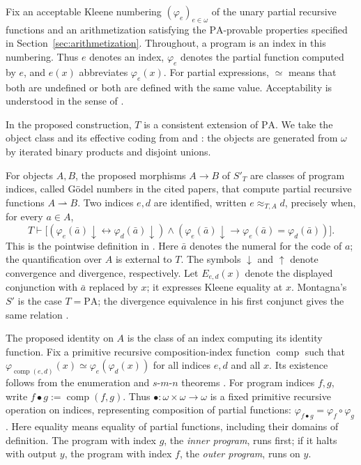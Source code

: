\documentclass[11pt]{article}
\newcommand{\PA}{\mathrm{PA}}
\newcommand{\comp}{\operatorname{comp}}
\begin{document}
Fix an acceptable Kleene numbering $(\varphi_e)_{e\in\omega}$ of the unary
partial recursive functions and an arithmetization satisfying the
$\PA$-provable properties specified in
Section~\ref{sec:arithmetization}.
Throughout, a program is an index in this
numbering. Thus $e$ denotes an index, $\varphi_e$ denotes the partial function
computed by $e$, and $e(x)$ abbreviates $\varphi_e(x)$.
For partial expressions, $\simeq$ means that both are undefined or
both are defined with the same value.
Acceptability is understood
in the sense of \cite[Definitions~II.5.1--II.5.2, p.~215]{Odifreddi}.

In the proposed construction, $T$ is a consistent extension of $\PA$.
We take the object class and its effective coding from
\cite[pp.~105--106]{Montagna} and
\cite[p.~646]{DiPaolaMontagna}: the objects are generated from
$\omega$ by iterated binary products and disjoint unions.

For objects $A,B$, the proposed morphisms $A\to B$ of $S'_T$ are
classes of program indices, called G\"odel numbers in the cited papers,
that compute partial recursive functions $A\rightharpoonup B$.
Two indices $e,d$ are identified,
written $e\approx_{T,A}d$, precisely when, for every $a\in A$,
\begin{equation*}
 T\vdash
 \bigl[(\varphi_e(\bar a)\downarrow
          \leftrightarrow\varphi_d(\bar a)\downarrow)
 \land
 (\varphi_e(\bar a)\downarrow
          \to\varphi_e(\bar a)=\varphi_d(\bar a))\bigr].
\end{equation*}
This is the pointwise definition in \cite[p.~646]{DiPaolaMontagna}.
Here $\bar a$ denotes the numeral for the code of $a$; the quantification
over $A$ is external to $T$.
The symbols $\downarrow$ and $\uparrow$ denote convergence and
divergence, respectively.
Let $E_{e,d}(x)$ denote the displayed conjunction with $\bar a$ replaced
by $x$; it expresses Kleene equality at $x$.
Montagna's $S'$ is the case $T=\PA$; the divergence equivalence in
his first conjunct gives the same relation
\cite[p.~106]{Montagna}.

The proposed identity on $A$ is the class of an index computing its identity
function. Fix a primitive recursive composition-index function $\comp$ such
that $\varphi_{\comp(e,d)}(x)\simeq\varphi_e(\varphi_d(x))$ for all indices
$e,d$ and all $x$. Its existence follows from the enumeration and
$s$-$m$-$n$ theorems \cite[Theorem~II.1.5 and Proposition~II.1.7, pp.~130--131]{Odifreddi}.
For program indices $f,g$, write $f\bullet g:=\comp(f,g)$.
Thus $\bullet:\omega\times\omega\to\omega$ is a fixed primitive
recursive operation on indices, representing composition of partial
functions: $\varphi_{f\bullet g}=\varphi_f\circ\varphi_g$.
Here equality means equality of partial functions, including their domains
of definition. The program with index $g$, the \emph{inner program},
runs first; if it halts with output $y$, the program with index $f$,
the \emph{outer program}, runs on $y$.
\end{document}
